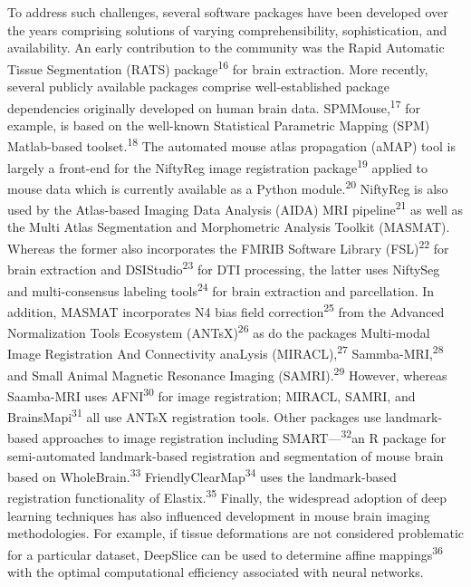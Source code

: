 \documentclass[
  12pt,
]{article}
\begin{document}
To address such challenges, several software packages have been
developed over the years comprising solutions of varying
comprehensibility, sophistication, and availability. An early
contribution to the community was the Rapid Automatic Tissue
Segmentation (RATS) package\textsuperscript{16} for brain extraction.
More recently, several publicly available packages comprise
well-established package dependencies originally developed on human
brain data. SPMMouse,\textsuperscript{17} for example, is based on the
well-known Statistical Parametric Mapping (SPM) Matlab-based
toolset.\textsuperscript{18} The automated mouse atlas propagation
(aMAP) tool is largely a front-end for the NiftyReg image registration
package\textsuperscript{19} applied to mouse data which is currently
available as a Python module.\textsuperscript{20} NiftyReg is also used
by the Atlas-based Imaging Data Analysis (AIDA) MRI
pipeline\textsuperscript{21} as well as the Multi Atlas Segmentation and
Morphometric Analysis Toolkit (MASMAT). Whereas the former also
incorporates the FMRIB Software Library (FSL)\textsuperscript{22} for
brain extraction and DSIStudio\textsuperscript{23} for DTI processing,
the latter uses NiftySeg and multi-consensus labeling
tools\textsuperscript{24} for brain extraction and parcellation. In
addition, MASMAT incorporates N4 bias field
correction\textsuperscript{25} from the Advanced Normalization Tools
Ecosystem (ANTsX)\textsuperscript{26} as do the packages Multi-modal
Image Registration And Connectivity anaLysis
(MIRACL),\textsuperscript{27} Sammba-MRI,\textsuperscript{28} and Small
Animal Magnetic Resonance Imaging (SAMRI).\textsuperscript{29} However,
whereas Saamba-MRI uses AFNI\textsuperscript{30} for image registration;
MIRACL, SAMRI, and BrainsMapi\textsuperscript{31} all use ANTsX
registration tools. Other packages use landmark-based approaches to
image registration including SMART---\textsuperscript{32}an R package
for semi-automated landmark-based registration and segmentation of mouse
brain based on WholeBrain.\textsuperscript{33}
FriendlyClearMap\textsuperscript{34} uses the landmark-based
registration functionality of Elastix.\textsuperscript{35} Finally, the
widespread adoption of deep learning techniques has also influenced
development in mouse brain imaging methodologies. For example, if tissue
deformations are not considered problematic for a particular dataset,
DeepSlice can be used to determine affine mappings\textsuperscript{36}
with the optimal computational efficiency associated with neural
networks.
\end{document}
